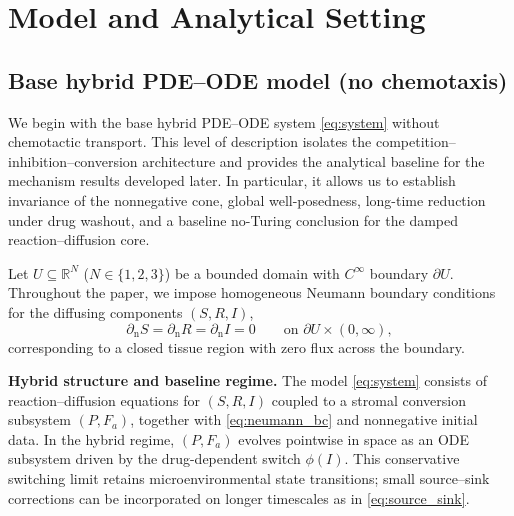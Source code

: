 \documentclass[pdflatex,sn-mathphys-ay]{sn-jnl}
\theoremstyle{thmstyleone}
\theoremstyle{definition}
\theoremstyle{remark}
\begin{document}
\section{Model and Analytical Setting}\label{sec:models}
\subsection{Base hybrid PDE--ODE model (no chemotaxis)}
\label{subsec:base_model}

We begin with the base hybrid PDE--ODE system \eqref{eq:system} without chemotactic transport. 
This level of description isolates the competition--inhibition--conversion architecture and provides the analytical baseline for the mechanism results developed later. 
In particular, it allows us to establish invariance of the nonnegative cone, global well-posedness, long-time reduction under drug washout, and a baseline no-Turing conclusion for the damped reaction--diffusion core.

Let $U\subseteq\mathbb{R}^N$ ($N\in\{1,2,3\}$) be a bounded domain with $C^\infty$ boundary $\partial U$. 
Throughout the paper, we impose homogeneous Neumann boundary conditions for the diffusing components $(S,R,I)$,
\begin{equation}
\label{eq:neumann_bc}
\partial_{\mathrm n}S=\partial_{\mathrm n}R=\partial_{\mathrm n}I=0
\qquad\text{on }\partial U\times(0,\infty),
\end{equation}
corresponding to a closed tissue region with zero flux across the boundary.

\medskip
\noindent\textbf{Hybrid structure and baseline regime.}
The model \eqref{eq:system} consists of reaction--diffusion equations for $(S,R,I)$ coupled to a stromal conversion subsystem $(P,F_a)$, together with \eqref{eq:neumann_bc} and nonnegative initial data. 
In the hybrid regime, $(P,F_a)$ evolves pointwise in space as an ODE subsystem driven by the drug-dependent switch $\phi(I)$. 
This conservative switching limit retains microenvironmental state transitions; small source--sink corrections can be incorporated on longer timescales as in \eqref{eq:source_sink}.
\end{document}
